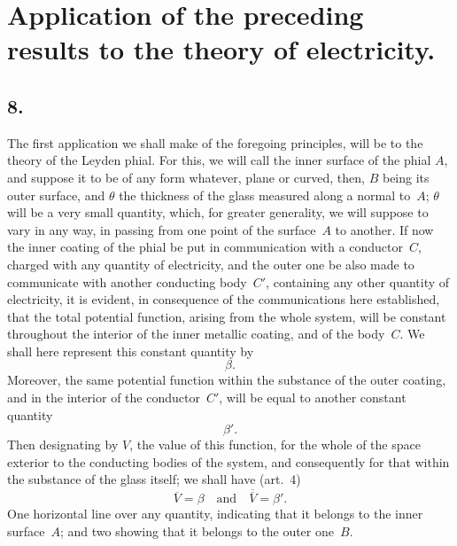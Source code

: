 \documentclass[11pt,notitlepage]{amsart}
\newcommand\Section[1]{\subsection{{#1}}}
\begin{document}
\section{Application of the preceding results to the theory of electricity.}
\Section{8.}
The first application we shall make of the foregoing principles, will
be to the theory of the Leyden phial. For this, we will call the inner surface
of the phial $A$, and suppose it to be of any form whatever, plane or curved,
then, $B$ being its outer surface, and $\theta$
the thickness of the glass measured
along a normal to~$A$; $\theta$ will be a
very small quantity, which, for greater
generality, we will suppose to vary in any way, in passing from one point
of the surface~$A$ to another. If now the inner coating of the phial be put
in communication with a conductor~$C$, charged with any quantity of electricity,
and the outer one be also made to communicate with another
conducting body~$C'$,
containing any other quantity of electricity,
it is evident, in consequence of the
communications here established, that the total potential function, arising from
the whole system, will be constant throughout the interior of the inner metallic
coating, and of the body~$C$.
We shall here represent this constant quantity by
\[
\beta.
\]
Moreover, the same potential function within the substance of the outer coating,
and in the interior of the conductor~$C'$,
will be equal to another constant quantity
\[
\beta'.
\]
Then designating by $V$, the value of this function, for the whole of the space
exterior to the conducting bodies of the system, and consequently for that
within the substance of the glass itself; we shall have (art.~4)
\[
\overline{V}=\beta
\quad\text{and}\quad
\overline{\overline{V}}=\beta'.
\]
One horizontal line over any quantity, indicating that it belongs to the inner
surface~$A$; and two showing that it belongs to the outer one~$B$.
\end{document}
